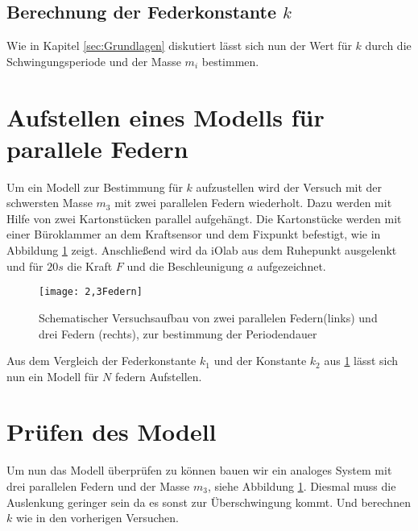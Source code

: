 \subsection{Berechnung der Federkonstante $k$}
Wie in Kapitel \ref{sec:Grundlagen} diskutiert lässt sich nun der Wert für $k$ durch die Schwingungsperiode und der Masse $m_i$ bestimmen.
\section{Aufstellen eines Modells für parallele Federn}
\label{sec:Modell}
Um ein Modell zur Bestimmung für $k$ aufzustellen wird der Versuch mit der schwersten  Masse $m_3$ mit zwei parallelen Federn wiederholt. Dazu werden mit Hilfe von zwei Kartonstücken parallel aufgehängt. Die Kartonstücke werden mit einer Büroklammer an dem Kraftsensor und dem Fixpunkt befestigt, wie in Abbildung \ref{fig:2,3 Federn} zeigt. Anschließend wird da iOlab aus dem Ruhepunkt ausgelenkt und für $20s$ die Kraft $F$ und die Beschleunigung $a$ aufgezeichnet.
\begin{figure}[htb!]
	\centering
	\texttt{[image: 2,3Federn]}
	\caption{\label{fig:2,3 Federn} Schematischer Versuchsaufbau von zwei parallelen Federn(links) und drei Federn (rechts), zur bestimmung der Periodendauer}
\end{figure}
Aus dem Vergleich der Federkonstante $k_1$ und der Konstante $k_2$ aus \ref{sec:Modell} lässt sich nun ein Modell für $N$ federn Aufstellen.
\section{Prüfen des Modell}
Um nun das Modell überprüfen zu können bauen wir ein analoges System mit drei parallelen Federn und der Masse $m_3$, siehe Abbildung \ref{fig:2,3 Federn}. Diesmal muss die Auslenkung geringer sein da es sonst zur Überschwingung kommt. Und berechnen $k$ wie in den vorherigen Versuchen.